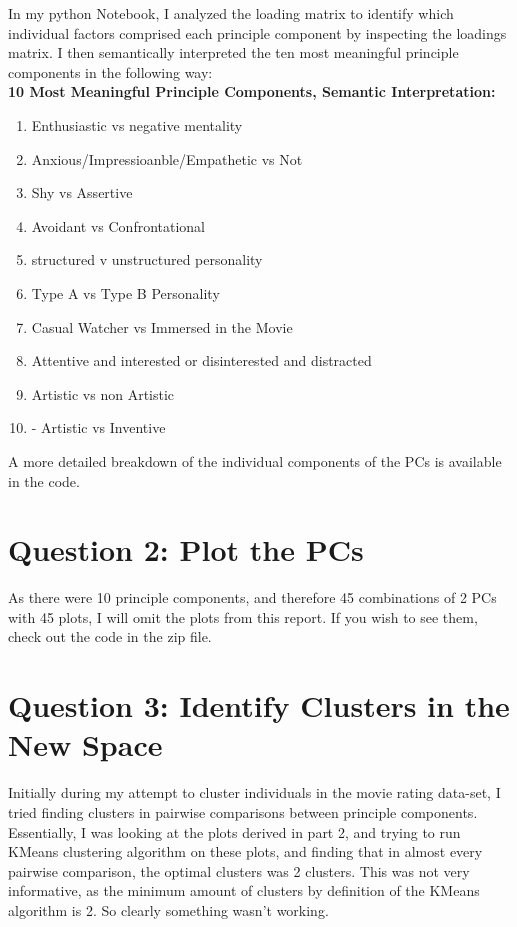 \documentclass[12pt,twoside]{article}
\begin{document}
In my python Notebook, I analyzed the loading matrix to identify which individual factors comprised each principle component by inspecting the loadings matrix. I then semantically interpreted the ten most meaningful principle components in the following way:\\

\textbf{10 Most Meaningful Principle Components, Semantic Interpretation:}
\begin{enumerate}
    \item Enthusiastic vs negative mentality
    \item Anxious/Impressioanble/Empathetic vs Not
    \item Shy vs Assertive
    \item Avoidant vs Confrontational
    \item structured v unstructured personality
    \item Type A vs Type B Personality
    \item Casual Watcher vs Immersed in the Movie
    \item Attentive and interested or disinterested and distracted
    \item Artistic vs non Artistic
\item- Artistic vs Inventive
\end{enumerate}

A more detailed breakdown of the individual components of the PCs is available in the code.

\section*{Question 2: Plot the PCs}
As there were 10 principle components, and therefore 45 combinations of 2 PCs with 45 plots, I will omit the plots from this report. If you wish to see them, check out the code in the zip file.

\section*{Question 3: Identify Clusters in the New Space}
Initially during my attempt to cluster individuals in the movie rating data-set, I tried finding clusters in pairwise comparisons between principle components. Essentially, I was looking at the plots derived in part 2, and trying to run KMeans clustering algorithm on these plots, and finding that in almost every pairwise comparison, the optimal clusters was 2 clusters. This was not very informative, as the minimum amount of clusters by definition of the KMeans algorithm is 2. So clearly something wasn't working.
\end{document}
